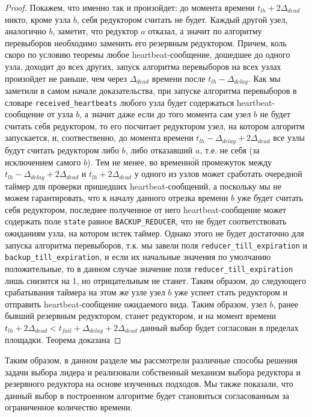 \begin{proof}
    Покажем, что именно так и произойдет: до момента времени $t_{lh} + 2\Delta_{dead}$ никто, кроме узла $b$, себя редуктором считать не будет. Каждый другой узел, аналогично $b$, заметит, что редуктор $a$ отказал, а значит по алгоритму перевыборов необходимо заменить его резервным редуктором. Причем, коль скоро по условию теоремы любое heartbeat-со\-об\-ще\-ние, дошедшее до одного узла, доходит до всех других, запуск алгоритма перевыборов на всех узлах произойдет не раньше, чем через $\Delta_{dead}$ времени после $t_{lh} - \Delta_{delay}$. Как мы заметили в самом начале доказательства, при запуске алгоритма перевыборов в словаре \texttt{received\_heartbeats} любого узла будет содержаться heartbeat-со\-об\-ще\-ние от узла $b$, а значит даже если до того момента сам узел $b$ не будет считать себя редуктором, то его посчитает редуктором узел, на котором алгоритм запускается, и, соотвественно, до момента времени $t_{lh} - \Delta_{delay} + 2\Delta_{dead}$ все узлы будут считать редуктором либо $b$, либо отказавший $a$, т.е. не себя (за исключением самого $b$). Тем не менее, во временн\'{о}й промежуток между $t_{lh} - \Delta_{delay} + 2\Delta_{dead}$ и $t_{lh} + 2\Delta_{dead}$ у одного из узлов может сработать очередной таймер для проверки пришедших heartbeat-со\-об\-ще\-ний, а поскольку мы не можем гарантировать, что к началу данного отрезка времени $b$ уже будет считать себя редуктором, последнее полученное от него heartbeat-со\-об\-ще\-ние может содержать поле \texttt{state} равное \texttt{BACKUP\_REDUCER}, что не будет соответствовать ожиданиям узла, на котором истек таймер. Однако этого не будет достаточно для запуска алгоритма перевыборов, т.к. мы завели поля \texttt{reducer\_till\_expiration} и \texttt{backup\_till\_expiration}, и если их начальные значения по умолчанию положительные, то в данном случае значение поля \texttt{reducer\_till\_expiration} лишь снизится на 1, но отрицательным не станет. Таким образом, до следующего срабатывания таймера на этом же узле узел $b$ уже успеет стать редуктором и отправить heartbeat-со\-об\-ще\-ние ожидаемого вида. Таким образом, узел $b$, ранее бывший резервным редуктором, станет редуктором, и на момент времени $t_{lh} + 2\Delta_{dead} < t_{fail} + \Delta_{delay} + 2\Delta_{dead}$ данный выбор будет согласован в пределах площадки. Теорема доказана
\end{proof}

Таким образом, в данном разделе мы рассмотрели различные способы решения задачи выбора лидера и реализовали собственный механизм выбора редуктора и резервного редуктора на основе изученных подходов. Мы также показали, что данный выбор в построенном алгоритме будет становиться согласованным за ограниченное количество времени.

